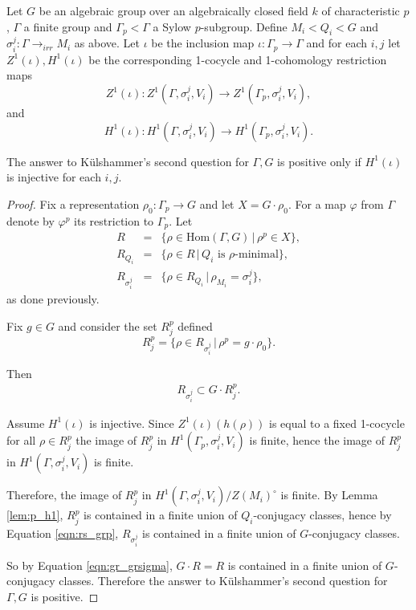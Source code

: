 \begin{theorem}
  Let $G$ be an algebraic group over an algebraically closed field $k$ of characteristic $p$, $\Gamma$ a finite group and $\Gamma_p < \Gamma$ a Sylow $p$-subgroup. Define $M_i < Q_i < G$ and $\sigma_i^{j}:\Gamma \rightarrow_{irr} M_{i}$ as above. Let $\iota$ be the inclusion map $\iota : \Gamma_p \rightarrow \Gamma$ and for each $i,j$ let $Z^1(\iota), H^1(\iota)$ be the corresponding 1-cocycle and 1-cohomology restriction maps
  \begin{displaymath}
    Z^1(\iota) : Z^1(\Gamma, \sigma_i^j, V_i) \rightarrow Z^1(\Gamma_p, \sigma_i^j, V_i),
  \end{displaymath}
  and
  \begin{displaymath}
    H^1(\iota) : H^1(\Gamma, \sigma_i^j, V_i) \rightarrow H^1(\Gamma_p, \sigma_i^j, V_i).
  \end{displaymath}
  
  The answer to K\"ulshammer's second question for $\Gamma, G$ is positive only if $H^1(\iota)$ is injective for each $i,j$.
  \label{thm:k2_h1}
\end{theorem}
\begin{proof}
  Fix a representation $\rho_0: \Gamma_p \rightarrow G$ and let $X = G \cdot \rho_0$. For a map $\varphi$ from $\Gamma$ denote by $\varphi^p$ its restriction to $\Gamma_p$. Let
  \begin{eqnarray*}
    R &=&  \{ \rho \in \textrm{Hom}(\Gamma, G) \,|\, \rho^p \in X\}, \\
    R_{Q_i} &=&  \{ \rho \in R \,|\, Q_i \textrm{ is } \rho \textrm{-minimal} \}, \\
    R_{\sigma_i^j} &=&  \{ \rho \in R_{Q_i} \,|\, \rho_{M_i} = \sigma_i^j \},
  \end{eqnarray*}
  as done previously.
  
  Fix $g \in G$ and consider the set $R_j^p$ defined
  \begin{displaymath}
    R_j^p = \{ \rho \in R_{\sigma_i^j} \,|\, \rho^p = g \cdot \rho_0 \}.
  \end{displaymath}

  Then
  \begin{eqnarray}
    R_{\sigma_i^j} \subset G \cdot R_j^p.
    \label{eqn:rs_grp}
  \end{eqnarray}

  Assume $H^1(\iota)$ is injective. Since $Z^1(\iota)(h(\rho))$ is equal to a fixed 1-cocycle for all $\rho \in R_j^p$ the image of $R_j^p$ in $H^1(\Gamma_p, \sigma_i^j, V_i)$ is finite, hence the image of $R_j^p$ in $H^1(\Gamma, \sigma_i^j, V_i)$ is finite. 
  
  Therefore, the image of $R_j^p$ in $H^1(\Gamma, \sigma_i^j, V_i)/Z(M_i)^\circ$ is finite. By Lemma \ref{lem:p_h1}, $R_j^p$ is contained in a finite union of $Q_i$-conjugacy classes, hence by Equation \ref{eqn:rs_grp}, $R_{\sigma_i^j}$ is contained in a finite union of $G$-conjugacy classes.

  So by Equation \ref{eqn:gr_grsigma}, $G \cdot R = R$ is contained in a finite union of $G$-conjugacy classes. Therefore the answer to K\"ulshammer's second question for $\Gamma, G$ is positive.
\end{proof}

